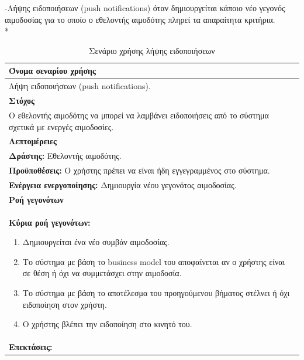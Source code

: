 \newpage
-Λήψης ειδοποιήσεων (push notifications) όταν δημιουργείται κάποιο νέο γεγονός αιμοδοσίας για το οποίο ο εθελοντής αιμοδότης πληρεί τα απαραίτητα κριτήρια.
\\*
\begin{table}[H]
	\begin{center}
	    \begin{tabular}{|p{\dimexpr \linewidth-2\tabcolsep}|}
	    \hline
	    \rowcolor{grayy}
	    \textbf{Όνομα σεναρίου χρήσης}
	    \\ \hline    
	     Λήψη ειδοποιήσεων (push notifications).
	     \\ \hline
	    \rowcolor{grayy}
	    \textbf{\textbf{Στόχος}}
	    \\ \hline
	 	 Ο εθελοντής αιμοδότης να μπορεί να λαμβάνει ειδοποιήσεις από το σύστημα σχετικά με ενεργές αιμοδοσίες. 
	    \\ \hline
	    \rowcolor{grayy}
	    \textbf{Λεπτομέρειες}
	    \\ \hline
		\textbf{Δράστης:} Εθελοντής αιμοδότης.
		\\*
		\textbf{Προϋποθέσεις:} Ο χρήστης πρέπει να είναι ήδη εγγεγραμμένος στο σύστημα.
		\\*
		\textbf{Ενέργεια ενεργοποίησης:} Δημιουργία νέου γεγονότος αιμοδοσίας.
		\\ \hline
		\rowcolor{grayy}    
	    \textbf{Ροή γεγονότων}
	    \\ \hline
		\textbf{Κύρια ροή γεγονότων:}
		\begin{enumerate}
			\item	Δημιουργείται ένα νέο συμβάν αιμοδοσίας.
			\item Το σύστημα με βάση το business model του αποφαίνεται αν ο χρήστης είναι σε θέση ή όχι να συμμετάσχει στην αιμοδοσία.
			\item Το σύστημα με βάση το αποτέλεσμα του προηγούμενου βήματος στέλνει ή όχι ειδοποίηση στον χρήστη.
			\item Ο χρήστης βλέπει την ειδοποίηση στο κινητό του.
		\end{enumerate}
		\\ \hline
		\rowcolor{grayy}
		\textbf{Επεκτάσεις:}
		   \\ \hline
	    \end{tabular}
	    \caption{Σενάριο χρήσης λήψης ειδοποιήσεων}
	    \label{tab:receive_push_notifications} 
	\end{center}
\end{table}

